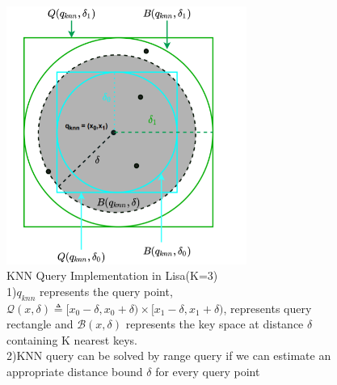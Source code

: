 \begin{figure}[t]
    \centering
    \includegraphics[width=0.7\textwidth]{graphs/KNN_Query_Lisa.png}
    \caption{KNN Query Implementation in Lisa(K=3)\\
    1)$q_{knn}$ represents the query point, $ \mathcal{Q}(x,\delta) \triangleq [x_{0}-\delta, x_{0}+\delta) \times[x_{1}-\delta, x_{1}+\delta)$, represents query rectangle and $ \mathcal{B}(x, \delta)$ represents the key space at distance $\delta$ containing K nearest keys.\\
    2)KNN query can be solved by range query if we can estimate an appropriate distance bound $\delta$ for every query point\\
    }
    \label{fig:KNN_Query_Lisa}
\end{figure}